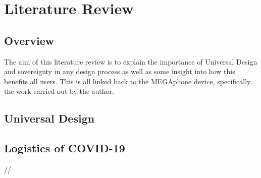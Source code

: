 
\chapter{Literature Review} %

\label{Chapter2} %


\section{Overview}

The aim of this literature review is to explain the importance of Universal Design and sovereignty in any design process as well as some insight into how this benefits all users. 
This is all linked back to the MEGAphone device, specifically, the work carried out by the author.


\section{Universal Design}




\section{Logistics of COVID-19}


//


